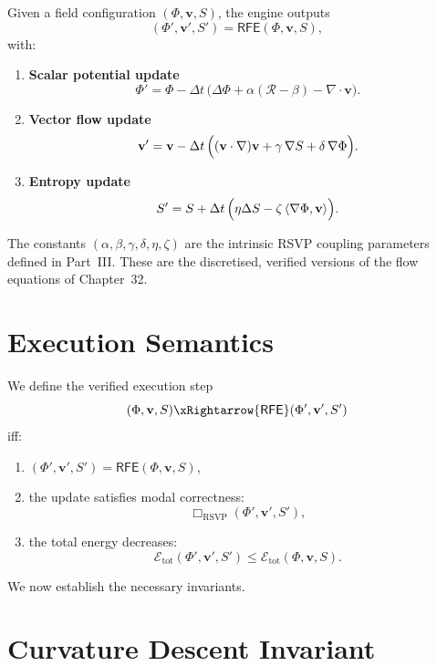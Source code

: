 \begin{definition}\label{def:RFE}
Given a field configuration $(\Phi,\mathbf{v},S)$, the engine outputs
\[
(\Phi',\mathbf{v}',S') = \mathsf{RFE}(\Phi,\mathbf{v},S),
\]
with:
\begin{enumerate}
\item \textbf{Scalar potential update}
\[
\Phi' = \Phi - \Delta t\,\bigl(\Delta \Phi 
+ \alpha(\mathcal{R}-\beta) 
- \nabla\!\cdot\mathbf{v}\bigr).
\]

\item \textbf{Vector flow update}
\[
\mathbf{v}' = \mathbf{v}
- \Delta t\,\Bigl(
(\mathbf{v}\cdot\nabla)\mathbf{v}
+ \gamma\,\nabla S
+ \delta\,\nabla\Phi
\Bigr).
\]

\item \textbf{Entropy update}
\[
S' = S + \Delta t\,\Bigl(\eta\Delta S 
- \zeta\,\langle\nabla\Phi,\mathbf{v}\rangle\Bigr).
\]
\end{enumerate}

The constants $(\alpha,\beta,\gamma,\delta,\eta,\zeta)$ are the intrinsic RSVP coupling parameters defined in Part~III.
These are the discretised, verified versions of the flow equations of Chapter~32.
\end{definition}

\section{Execution Semantics}

\begin{definition}\label{def:step}
We define the verified execution step
\[
(\Phi,\mathbf{v},S) \xRightarrow{\mathsf{RFE}} (\Phi',\mathbf{v}',S')
\]
iff:
\begin{enumerate}
\item $(\Phi',\mathbf{v}',S') = \mathsf{RFE}(\Phi,\mathbf{v},S)$,
\item the update satisfies modal correctness:
\[
\Box_{\mathrm{RSVP}}(\Phi',\mathbf{v}',S'),
\]
\item the total energy decreases:
\[
\mathcal{E}_{\mathrm{tot}}(\Phi',\mathbf{v}',S')
\le
\mathcal{E}_{\mathrm{tot}}(\Phi,\mathbf{v},S).
\]
\end{enumerate}
\end{definition}

We now establish the necessary invariants.

\section{Curvature Descent Invariant}


